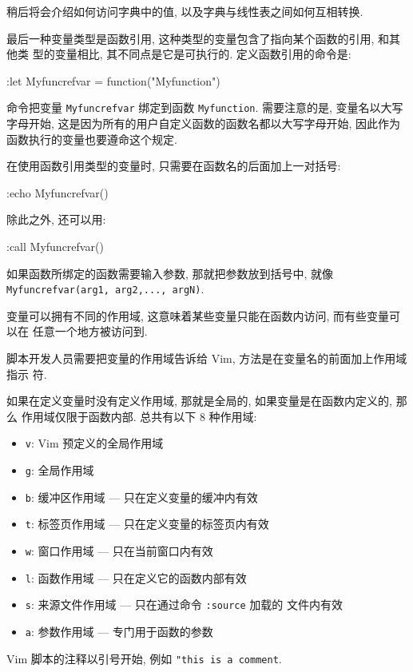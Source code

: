 稍后将会介绍如何访问字典中的值, 以及字典与线性表之间如何互相转换.

最后一种变量类型是函数引用, 这种类型的变量包含了指向某个函数的引用, 和其他类
型的变量相比, 其不同点是它是可执行的. 定义函数引用的命令是:
\begin{vimcode}
:let Myfuncrefvar = function("Myfunction")
\end{vimcode}
命令把变量 \texttt{Myfuncrefvar} 绑定到函数 \texttt{Myfunction}. 需要注意的是,
变量名以大写字母开始, 这是因为所有的用户自定义函数的函数名都以大写字母开始,
因此作为函数执行的变量也要遵命这个规定.

在使用函数引用类型的变量时, 只需要在函数名的后面加上一对括号:
\begin{vimcode}
:echo Myfuncrefvar()
\end{vimcode}
除此之外, 还可以用:
\begin{vimcode}
:call Myfuncrefvar()
\end{vimcode}

如果函数所绑定的函数需要输入参数, 那就把参数放到括号中, 就像
\texttt{Myfuncrefvar(arg1, arg2,..., argN)}.

变量可以拥有不同的作用域, 这意味着某些变量只能在函数内访问, 而有些变量可以在
任意一个地方被访问到.

脚本开发人员需要把变量的作用域告诉给 Vim, 方法是在变量名的前面加上作用域指示
符.

如果在定义变量时没有定义作用域, 那就是全局的, 如果变量是在函数内定义的, 那么
作用域仅限于函数内部. 总共有以下 8 种作用域:
\begin{itemize}
    \item \texttt{v}: Vim 预定义的全局作用域
    \item \texttt{g}: 全局作用域
    \item \texttt{b}: 缓冲区作用域 --- 只在定义变量的缓冲内有效
    \item \texttt{t}: 标签页作用域 --- 只在定义变量的标签页内有效
    \item \texttt{w}: 窗口作用域 --- 只在当前窗口内有效
    \item \texttt{l}: 函数作用域 --- 只在定义它的函数内部有效
    \item \texttt{s}: 来源文件作用域 --- 只在通过命令 \texttt{:source} 加载的
        文件内有效
    \item \texttt{a}: 参数作用域 --- 专门用于函数的参数
\end{itemize}

\begin{warning}
    Vim 脚本的注释以引号开始, 例如 \texttt{"this is a comment}.
\end{warning}

